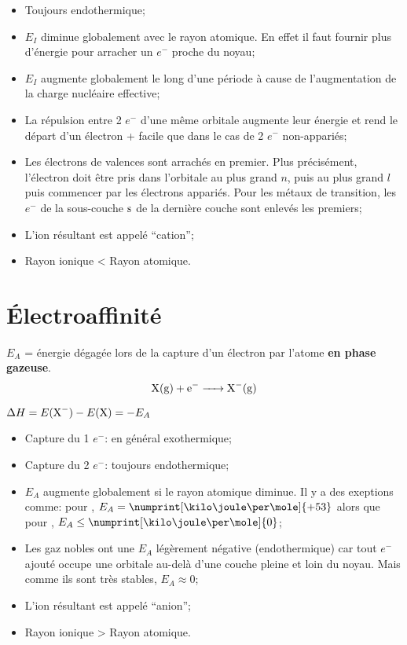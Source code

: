 \begin{itemize}
  \item Toujours endothermique;
  \item $E_I$ diminue globalement avec le rayon atomique.
    En effet il faut fournir plus d'énergie pour arracher un $e^-$ proche du noyau;
  \item $E_I$ augmente globalement le long d'une période à cause de l'augmentation de la charge nucléaire effective;
  \item La répulsion entre 2 $e^-$ d'une même orbitale augmente leur énergie et rend le départ d'un électron + facile que dans le cas de 2 $e^-$ non-appariés;
  \item Les électrons de valences sont arrachés en premier.
    Plus précisément,
    l'électron doit être pris dans l'orbitale au plus grand $n$,
    puis au plus grand $l$ puis commencer par les électrons appariés.
    Pour les métaux de transition,
    les $e^-$ de la sous-couche $\mathrm{s}$ de la dernière couche sont enlevés les premiers;
  \item L'ion résultant est appelé ``cation'';
  \item Rayon ionique < Rayon atomique.
\end{itemize}

\section{\'Electroaffinité}
\label{sec:electro}

$E_A$ = énergie dégagée lors de la capture d'un électron par l'atome \textbf{en phase gazeuse}.
\[ \ce{X(g) + e- -> X^-(g)} \]

$\Delta H = E(\ce{X^-})-E(\ce{X})=-E_A$

\begin{itemize}
  \item Capture du 1 $e^-$: en général exothermique;
  \item Capture du 2 $e^-$: toujours endothermique;
  \item $E_A$ augmente globalement si le rayon atomique diminue.
    Il y a des exeptions comme:
    pour ,
    $E_A = \numprint[\kilo\joule\per\mole]{+53}$ alors que pour ,
    $E_A \leq \numprint[\kilo\joule\per\mole]{0}$;
  \item Les gaz nobles ont une $E_A$ légèrement négative (endothermique) car tout $e^-$ ajouté occupe une orbitale au-delà d'une couche pleine et loin du noyau.
    Mais comme ils sont très stables,
    $E_A \approx 0$;
  \item L'ion résultant est appelé ``anion'';
  \item Rayon ionique > Rayon atomique.
\end{itemize}

